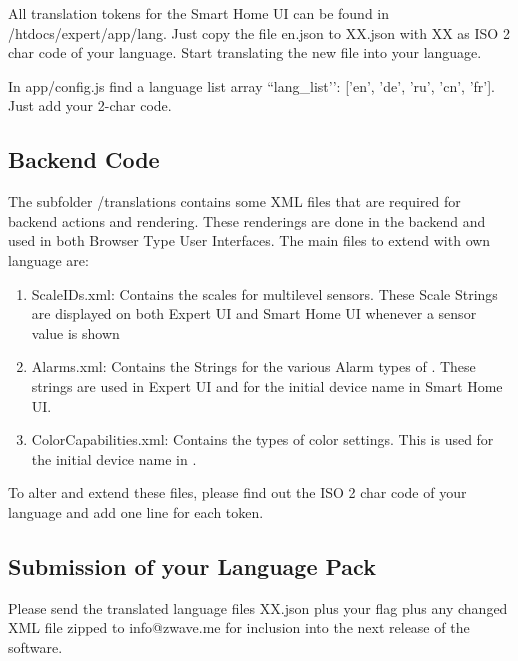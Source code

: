 All translation tokens for the Smart Home UI can be found in /htdocs/expert/app/lang. Just 
copy the file en.json to XX.json with XX as ISO 2 char code of your language. Start 
translating the new file into your language.

In app/config.js find a language list array ``lang\_list’’: ['en', 'de', 'ru', 'cn', 'fr']. 
Just add your 2-char code.

\subsection{Backend Code}

The subfolder /translations contains some XML files that are required for backend 
actions and rendering. These renderings are done in the backend and used in both Browser 
Type User Interfaces. The main files to extend with own language are:
\begin{enumerate}
\item ScaleIDs.xml: Contains the scales for multilevel sensors. These Scale Strings are 
displayed on both Expert UI and Smart Home UI whenever a sensor value is shown
\item Alarms.xml: Contains the Strings for the various Alarm types of \zwave. These 
strings are used in Expert UI and for the initial device name in Smart Home UI.
\item ColorCapabilities.xml: Contains the types of color settings. This is used for 
the initial device name in \zwshui.
\end{enumerate}

To alter and extend these files, please find out the ISO 2 char code of your language and add one line for each token.

\subsection{Submission of your Language Pack}

Please send the translated language files XX.json plus your flag plus any changed XML 
file zipped to info@zwave.me for inclusion into the next release of the software.